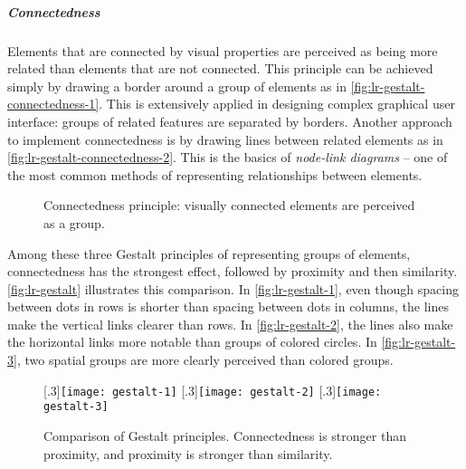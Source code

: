 \subparagraph{Connectedness} 
Elements that are connected by visual properties are perceived as being more related than elements that are not connected. This principle can be achieved simply by drawing a border around a group of elements as in \autoref{fig:lr-gestalt-connectedness-1}. This is extensively applied in designing complex graphical user interface: groups of related features are separated by borders. Another approach to implement connectedness is by drawing lines between related elements as in \autoref{fig:lr-gestalt-connectedness-2}. This is the basics of \emph{node-link diagrams} -- one of the most common methods of representing relationships between elements.

\begin{figure}[!htb]
	\centering
	\hfill
	\caption{Connectedness principle: visually connected elements are perceived as a group. }
	\label{fig:lr-gestalt-connectedness}
\end{figure}

Among these three Gestalt principles of representing groups of elements, connectedness has the strongest effect, followed by proximity and then similarity. \autoref{fig:lr-gestalt} illustrates this comparison. In \autoref{fig:lr-gestalt-1}, even though spacing between dots in rows is shorter than spacing between dots in columns, the lines make the vertical links clearer than rows. In \autoref{fig:lr-gestalt-2}, the lines also make the horizontal links more notable than groups of colored circles. In \autoref{fig:lr-gestalt-3}, two spatial groups are more clearly perceived than colored groups.

\begin{figure}[!htb]
	\centering
	[.3\columnwidth]{\texttt{[image: gestalt-1]}} 
	\hfill
	[.3\columnwidth]{\texttt{[image: gestalt-2]}} 
	\hfill
	[.3\columnwidth]{\texttt{[image: gestalt-3]}}
	\caption{Comparison of Gestalt principles. Connectedness is stronger than proximity, and proximity is stronger than similarity. }
	\label{fig:lr-gestalt}
\end{figure}

